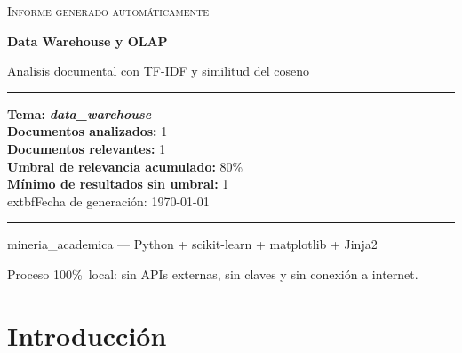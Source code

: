 \documentclass[11pt,a4paper]{article}
\newcommand{\tema}[1]{\textbf{\textit{#1}}}
\newcommand{\pcento}{\%}
\begin{document}
\begin{titlepage}
  \centering
  \vspace*{2.0cm}

  {\Large\textsc{Informe generado automáticamente}\par}
  \vspace{0.7cm}
  {\huge\bfseries Data Warehouse y OLAP\par}
  \vspace{0.4cm}
  {\large Analisis documental con TF-IDF y similitud del coseno\par}

  \vspace{1.8cm}

  \begin{minipage}{0.92\textwidth}
    \hrule
    \vspace{0.4cm}
    {\small
    \textbf{Tema:} \tema{ data\_warehouse }\\[4pt]
    \textbf{Documentos analizados:} 1\\
    \textbf{Documentos relevantes:} 1\\
    \textbf{Umbral de relevancia acumulado:} 80\pcento\\
    \textbf{Mínimo de resultados sin umbral:} 1\\
      	extbf{Fecha de generación:} \today
    \par}
    \vspace{0.4cm}
    \hrule
  \end{minipage}

  \vfill

  {\small mineria\_academica --- Python + scikit-learn + matplotlib + Jinja2\par}
  {\footnotesize
   Proceso 100\pcento\ local: sin APIs externas, sin claves y sin conexión
   a internet.\par}
\end{titlepage}

\tableofcontents
\newpage

\section{Introducción}
\label{sec:introduccion}
\end{document}

